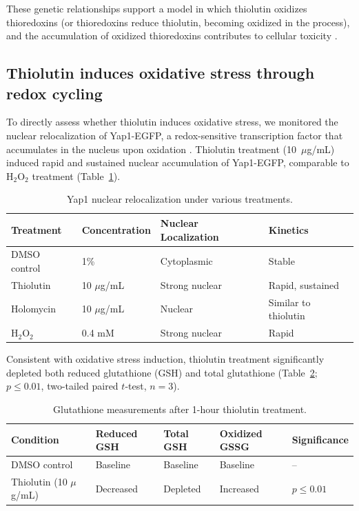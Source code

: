 \documentclass[11pt,a4paper]{article}
\begin{document}
These genetic relationships support a model in which thiolutin oxidizes thioredoxins (or thioredoxins reduce thiolutin, becoming oxidized in the process), and the accumulation of oxidized thioredoxins contributes to cellular toxicity \citep{Toledano2007, Herrero2008}.

\subsection{Thiolutin induces oxidative stress through redox cycling}

To directly assess whether thiolutin induces oxidative stress, we monitored the nuclear relocalization of Yap1-EGFP, a redox-sensitive transcription factor that accumulates in the nucleus upon oxidation \citep{Kuge1997, Delaunay2002}. Thiolutin treatment (10~$\mu$g/mL) induced rapid and sustained nuclear accumulation of Yap1-EGFP, comparable to H$_2$O$_2$ treatment (Table~\ref{tab:yap1}).

\begin{table}[htbp]
\centering
\caption{Yap1 nuclear relocalization under various treatments.}
\label{tab:yap1}
\begin{tabular}{llll}
\toprule
\textbf{Treatment} & \textbf{Concentration} & \textbf{Nuclear Localization} & \textbf{Kinetics} \\
\midrule
DMSO control & 1\% & Cytoplasmic & Stable \\
Thiolutin & 10 $\mu$g/mL & Strong nuclear & Rapid, sustained \\
Holomycin & 10 $\mu$g/mL & Nuclear & Similar to thiolutin \\
H$_2$O$_2$ & 0.4 mM & Strong nuclear & Rapid \\
\bottomrule
\end{tabular}
\end{table}

Consistent with oxidative stress induction, thiolutin treatment significantly depleted both reduced glutathione (GSH) and total glutathione (Table~\ref{tab:gsh}; $p \leq 0.01$, two-tailed paired $t$-test, $n = 3$).

\begin{table}[htbp]
\centering
\caption{Glutathione measurements after 1-hour thiolutin treatment.}
\label{tab:gsh}
\begin{tabular}{lllll}
\toprule
\textbf{Condition} & \textbf{Reduced GSH} & \textbf{Total GSH} & \textbf{Oxidized GSSG} & \textbf{Significance} \\
\midrule
DMSO control & Baseline & Baseline & Baseline & -- \\
Thiolutin (10 $\mu$g/mL) & Decreased & Depleted & Increased & $p \leq 0.01$ \\
\bottomrule
\end{tabular}
\end{table}
\end{document}
